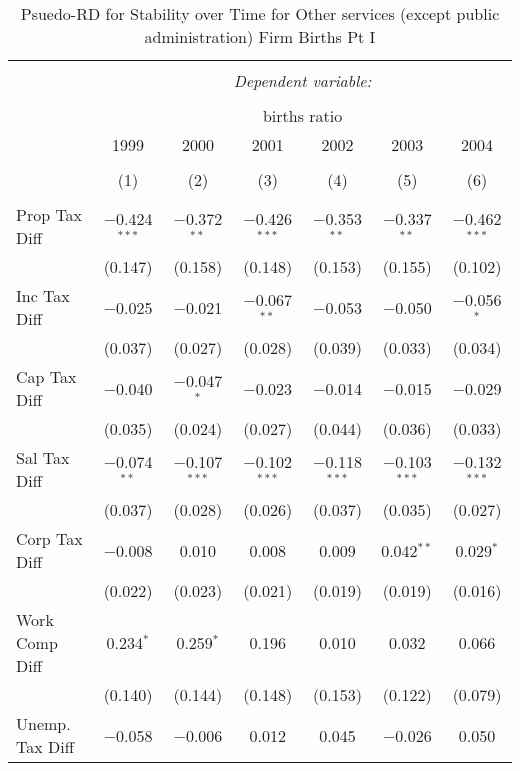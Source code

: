 
\begin{table}[!htbp] \centering 
  \caption{Psuedo-RD for Stability over Time for  Other services (except public administration) Firm Births Pt I} 
  \label{81year} 
\small 
\begin{tabular}{@{\extracolsep{5pt}}lcccccc} 
\\[-1.8ex]\hline 
\hline \\[-1.8ex] 
 & \multicolumn{6}{c}{\textit{Dependent variable:}} \\ 
\cline{2-7} 
\\[-1.8ex] & \multicolumn{6}{c}{births ratio} \\ 
 & 1999 & 2000 & 2001 & 2002 & 2003 & 2004 \\ 
\\[-1.8ex] & (1) & (2) & (3) & (4) & (5) & (6)\\ 
\hline \\[-1.8ex] 
 Prop Tax Diff & $-$0.424$^{***}$ & $-$0.372$^{**}$ & $-$0.426$^{***}$ & $-$0.353$^{**}$ & $-$0.337$^{**}$ & $-$0.462$^{***}$ \\ 
  & (0.147) & (0.158) & (0.148) & (0.153) & (0.155) & (0.102) \\ 
  Inc Tax Diff & $-$0.025 & $-$0.021 & $-$0.067$^{**}$ & $-$0.053 & $-$0.050 & $-$0.056$^{*}$ \\ 
  & (0.037) & (0.027) & (0.028) & (0.039) & (0.033) & (0.034) \\ 
  Cap Tax Diff & $-$0.040 & $-$0.047$^{*}$ & $-$0.023 & $-$0.014 & $-$0.015 & $-$0.029 \\ 
  & (0.035) & (0.024) & (0.027) & (0.044) & (0.036) & (0.033) \\ 
  Sal Tax Diff & $-$0.074$^{**}$ & $-$0.107$^{***}$ & $-$0.102$^{***}$ & $-$0.118$^{***}$ & $-$0.103$^{***}$ & $-$0.132$^{***}$ \\ 
  & (0.037) & (0.028) & (0.026) & (0.037) & (0.035) & (0.027) \\ 
  Corp Tax Diff & $-$0.008 & 0.010 & 0.008 & 0.009 & 0.042$^{**}$ & 0.029$^{*}$ \\ 
  & (0.022) & (0.023) & (0.021) & (0.019) & (0.019) & (0.016) \\ 
  Work Comp Diff & 0.234$^{*}$ & 0.259$^{*}$ & 0.196 & 0.010 & 0.032 & 0.066 \\ 
  & (0.140) & (0.144) & (0.148) & (0.153) & (0.122) & (0.079) \\ 
  Unemp. Tax Diff & $-$0.058 & $-$0.006 & 0.012 & 0.045 & $-$0.026 & 0.050 \\ 

\end{tabular}
\end{table}
